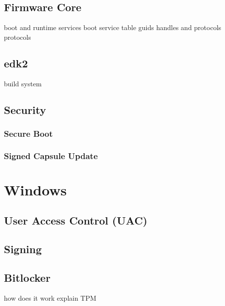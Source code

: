 \subsection{Firmware Core}
boot and runtime services
boot service table
guids
handles and protocols
protocols

\subsection{edk2}
build system

\subsection{Security}
\subsubsection{Secure Boot}
\subsubsection{Signed Capsule Update}

\section{Windows}
\subsection{User Access Control (UAC)}
\subsection{Signing}
\subsection{Bitlocker}
how does it work
explain TPM



